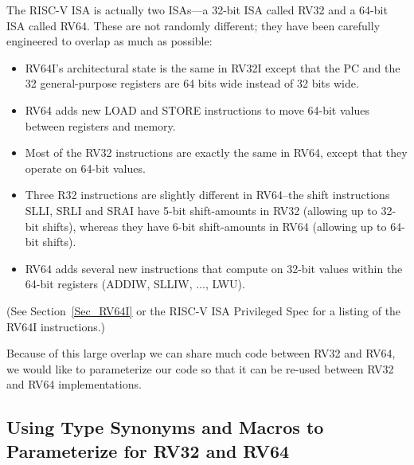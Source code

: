 
The RISC-V ISA is actually two ISAs---a 32-bit ISA called RV32 and a
64-bit ISA called RV64.  These are not randomly different; they have
been carefully engineered to overlap as much as possible:

\begin{itemize}

 \item RV64I's architectural state is the same in RV32I except that
       the PC and the 32 general-purpose registers are 64 bits wide
       instead of 32 bits wide.

 \item RV64 adds new LOAD and STORE instructions to move 64-bit values
       between registers and memory.

 \item Most of the RV32 instructions are exactly the same in RV64,
       except that they operate on 64-bit values.


 \item Three R32 instructions are slightly different in RV64--the
       shift instructions SLLI, SRLI and SRAI have 5-bit shift-amounts
       in RV32 (allowing up to 32-bit shifts), whereas they have 6-bit
       shift-amounts in RV64 (allowing up to 64-bit shifts).

 \item RV64 adds several new instructions that compute on 32-bit
       values within the 64-bit registers (ADDIW, SLLIW, ..., LWU).

\end{itemize}

(See Section~\ref{Sec_RV64I} or the RISC-V ISA Privileged Spec for a
listing of the RV64I instructions.)

Because of this large overlap we can share much {\BSV} code between
RV32 and RV64, {\ie} we would like to parameterize our {\BSV} code so
that it can be re-used between RV32 and RV64 implementations.


\subsection{Using Type Synonyms and Macros to Parameterize for RV32 and RV64}

\label{Sec_Type_Synonums_and_Macros}


